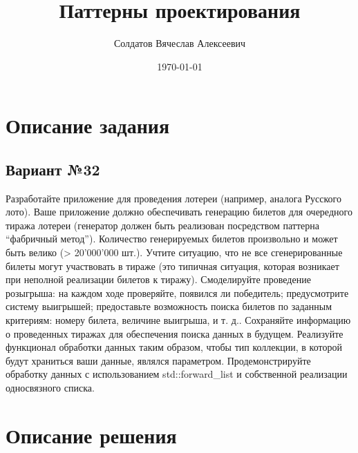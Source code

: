 \documentclass[a4paper,14pt]{article}
\author{Солдатов Вячеслав Алексеевич}
\title{Паттерны проектирования}
\date{\today}
\begin{document}
\maketitle
\setcounter{page}{2}
\tableofcontents
\clearpage
\clearpage


\section{Описание задания}
\subsection{Вариант №32}
Разработайте приложение для проведения лотереи (например, аналога
Русского лото). Ваше приложение должно обеспечивать генерацию билетов для
очередного тиража лотереи (генератор должен быть реализован посредством
паттерна “фабричный метод”). Количество генерируемых билетов произвольно и
может быть велико (> 20’000’000 шт.). Учтите ситуацию, что не все
сгенерированные билеты могут участвовать в тираже (это типичная ситуация,
которая возникает при неполной реализации билетов к тиражу). Смоделируйте
проведение розыгрыша: на каждом ходе проверяйте, появился ли победитель;
предусмотрите систему выигрышей; предоставьте возможность поиска билетов
по заданным критериям: номеру билета, величине выигрыша, и т. д.. Сохраняйте
информацию о проведенных тиражах для обеспечения поиска данных в
будущем. Реализуйте функционал обработки данных таким образом, чтобы тип
коллекции, в которой будут храниться ваши данные, являлся параметром.
Продемонстрируйте обработку данных с использованием std::forward\_list и
собственной реализации односвязного списка.
\clearpage

\section{Описание решения}
\end{document}
